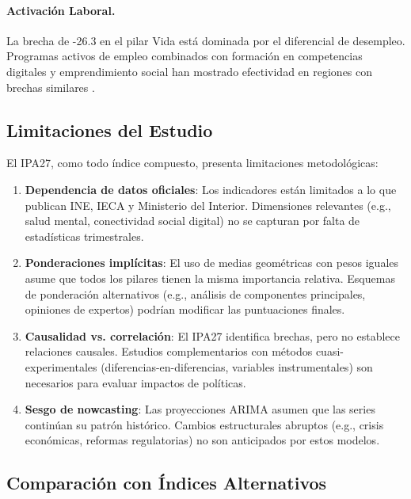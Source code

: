 \documentclass[authoryear,12pt]{elsarticle}
\begin{document}
\paragraph{Activación Laboral.} La brecha de -26.3 en el pilar Vida está dominada por el diferencial de desempleo. Programas activos de empleo combinados con formación en competencias digitales y emprendimiento social han mostrado efectividad en regiones con brechas similares \citep{caliendo2016active}.

\subsection{Limitaciones del Estudio}

El IPA27, como todo índice compuesto, presenta limitaciones metodológicas:

\begin{enumerate}
    \item \textbf{Dependencia de datos oficiales}: Los indicadores están limitados a lo que publican INE, IECA y Ministerio del Interior. Dimensiones relevantes (e.g., salud mental, conectividad social digital) no se capturan por falta de estadísticas trimestrales.

    \item \textbf{Ponderaciones implícitas}: El uso de medias geométricas con pesos iguales asume que todos los pilares tienen la misma importancia relativa. Esquemas de ponderación alternativos (e.g., análisis de componentes principales, opiniones de expertos) podrían modificar las puntuaciones finales.

    \item \textbf{Causalidad vs. correlación}: El IPA27 identifica brechas, pero no establece relaciones causales. Estudios complementarios con métodos cuasi-experimentales (diferencias-en-diferencias, variables instrumentales) son necesarios para evaluar impactos de políticas.

    \item \textbf{Sesgo de nowcasting}: Las proyecciones ARIMA asumen que las series continúan su patrón histórico. Cambios estructurales abruptos (e.g., crisis económicas, reformas regulatorias) no son anticipados por estos modelos.
\end{enumerate}

\subsection{Comparación con Índices Alternativos}
\end{document}
